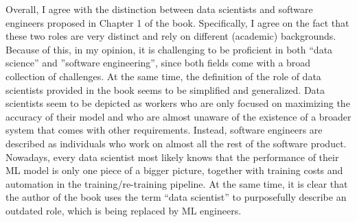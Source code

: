 Overall, I agree with the distinction between data scientists and software engineers proposed in Chapter 1 of the book. Specifically, I agree on the fact that these two roles are very distinct and rely on different (academic) backgrounds. Because of this, in my opinion, it is challenging to be proficient in both “data science” and ”software engineering”, since both fields come with a broad collection of challenges. At the same time, the definition of the role of data scientists provided in the book seems to be simplified and generalized. Data scientists seem to be depicted as workers who are only focused on maximizing the accuracy of their model and who are almost unaware of the existence of a broader system that comes with other requirements. Instead, software engineers are described as individuals who work on almost all the rest of the software product. Nowadays, every data scientist most likely knows that the performance of their ML model is only one piece of a bigger picture, together with training costs and automation in the training/re-training pipeline. At the same time, it is clear that the author of the book uses the term “data scientist” to purposefully describe an outdated role, which is being replaced by ML engineers. \\

